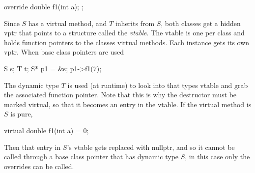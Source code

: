 \documentclass{report}
\begin{document}
\begin{itemize}
\begin{cppcode}
{                        override double f1(int a);
                    };
                \end{cppcode}
                \bigbreak \noindent 
                Since $S$ has a virtual method, and $T$ inherits from $S$, both classes get a hidden vptr that points to a structure called the \textit{vtable}.
                \bigbreak \noindent 
                The vtable is one per class and holds function pointers to the classes virtual methods. Each instance gets its own vptr. When base class pointers are used
                \bigbreak \noindent 
                \begin{cppcode}
                S s;
                T t;
                S* p1 = &s;
                p1->f1(7);
                \end{cppcode}
                \bigbreak \noindent 
                The dynamic type $T$ is used (at runtime) to look into that types vtable and grab the associated function pointer. Note that this is why the destructor must be marked virtual, so that it becomes an entry in the vtable.
                \bigbreak \noindent 
                If the virtual method is $S$ is pure,
                \bigbreak \noindent 
                \begin{cppcode}
                virtual double f1(int a) = 0;
                \end{cppcode}
                \bigbreak \noindent 
                Then that entry in $S$'s vtable gets replaced with nullptr, and so it cannot be called through a base class pointer that has dynamic type $S$, in this case only the overrides can be called.





        \end{itemize}

        \pagebreak 
\end{document}
